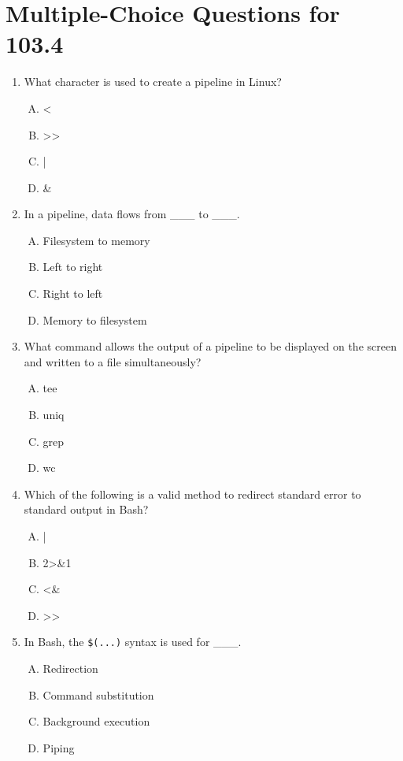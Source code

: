 \documentclass[a4paper]{report}
\begin{document}
\section*{Multiple-Choice Questions for 103.4}
\begin{enumerate}[1.]

    \item What character is used to create a pipeline in Linux?  
    \begin{enumerate}[A)]
        \item <  
        \item >>  
        \item |  
        \item \&  
    \end{enumerate}

    \item In a pipeline, data flows from \_\_\_ to \_\_\_.  
    \begin{enumerate}[A)]
        \item Filesystem to memory  
        \item Left to right  
        \item Right to left  
        \item Memory to filesystem  
    \end{enumerate}

    \item What command allows the output of a pipeline to be displayed on the screen and written to a file simultaneously?  
    \begin{enumerate}[A)]
        \item tee  
        \item uniq  
        \item grep  
        \item wc  
    \end{enumerate}

    \item Which of the following is a valid method to redirect standard error to standard output in Bash?  
    \begin{enumerate}[A)]
        \item |  
        \item 2>\&1  
        \item <\&  
        \item >>  
    \end{enumerate}

    \item In Bash, the \texttt{\$(...)} syntax is used for \_\_\_.  
    \begin{enumerate}[A)]
        \item Redirection  
        \item Command substitution  
        \item Background execution  
        \item Piping  
    \end{enumerate}


\end{enumerate}
\end{document}
